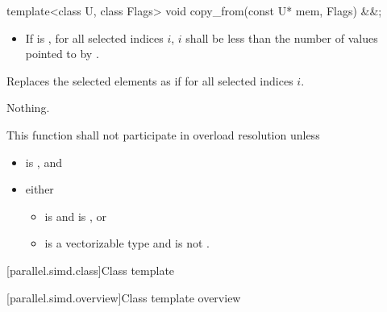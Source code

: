 \begin{itemdecl}
template<class U, class Flags> void copy_from(const U* mem, Flags) &&;
\end{itemdecl}

\begin{itemdescr}
  \pnum\requires
  \begin{itemize}
    \item If   is , for all selected indices $i$, $i$ shall be less than the number of values pointed to by .
  \end{itemize}

  \pnum\effects
  Replaces the selected elements as if  for all selected indices $i$.

  \pnum\throws Nothing.

  \pnum\remarks
  This function shall not participate in overload resolution unless
  \begin{itemize}
    \item {} is , and
    \item either
      \begin{itemize}
        \item {} is  and  is , or
        \item {} is a vectorizable type and  is not .
      \end{itemize}
  \end{itemize}
\end{itemdescr}

[parallel.simd.class]{Class template }

[parallel.simd.overview]{Class template  overview}


